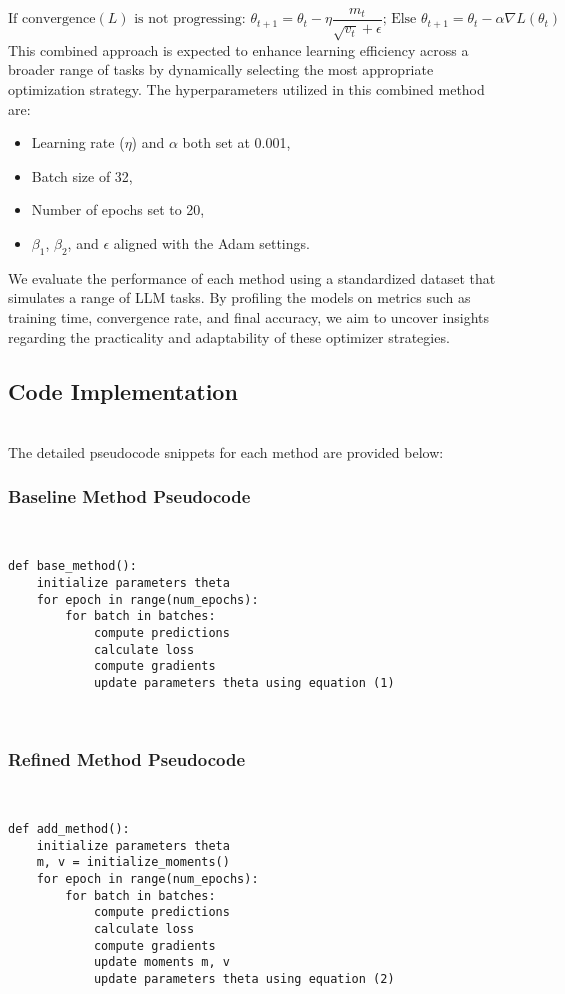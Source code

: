 \documentclass{article} %
\begin{document}
\begin{equation}  
\text{If } \text{convergence}(L) \text{ is not progressing: } \theta_{t+1} = \theta_t - \eta \frac{m_t}{\sqrt{v_t} + \epsilon} \text{; Else } \theta_{t+1} = \theta_t - \alpha \nabla L(\theta_t)  
\end{equation}  
This combined approach is expected to enhance learning efficiency across a broader range of tasks by dynamically selecting the most appropriate optimization strategy. The hyperparameters utilized in this combined method are:  \
\begin{itemize}  
    \item Learning rate ($\eta$) and $\alpha$ both set at 0.001,  
    \item Batch size of 32,  
    \item Number of epochs set to 20,  
    \item $\beta_1$, $\beta_2$, and $\epsilon$ aligned with the Adam settings.  
\end{itemize}  
We evaluate the performance of each method using a standardized dataset that simulates a range of LLM tasks. By profiling the models on metrics such as training time, convergence rate, and final accuracy, we aim to uncover insights regarding the practicality and adaptability of these optimizer strategies.  \\
\subsection{Code Implementation}  \\
The detailed pseudocode snippets for each method are provided below:  \
\subsubsection{Baseline Method Pseudocode}  \
\begin{verbatim}  
def base_method():  
    initialize parameters theta  
    for epoch in range(num_epochs):  
        for batch in batches:  
            compute predictions  
            calculate loss  
            compute gradients  
            update parameters theta using equation (1)  
\end{verbatim}  \
\subsubsection{Refined Method Pseudocode}  \
\begin{verbatim}  
def add_method():  
    initialize parameters theta  
    m, v = initialize_moments()  
    for epoch in range(num_epochs):  
        for batch in batches:  
            compute predictions  
            calculate loss  
            compute gradients  
            update moments m, v  
            update parameters theta using equation (2)  
\end{verbatim}  \
\end{document}
